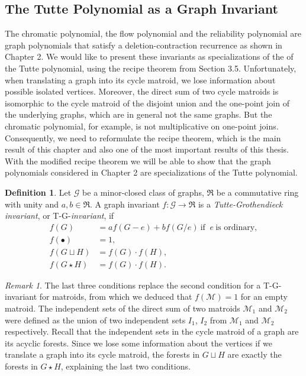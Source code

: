 \documentclass[12pt,a4paper, twoside, autooneside=false]{scrartcl}
\theoremstyle{definition}
\newtheorem{definition}[theorem]{Definition}
\theoremstyle{remark}
\newtheorem{remark}[theorem]{Remark}
\numberwithin{equation}{section}
\newcommand{\M}{\mathcal{M}} %
\begin{document}
\subsection{The Tutte Polynomial as a Graph Invariant}
The chromatic polynomial, the flow polynomial and the reliability polynomial are graph polynomials that satisfy a deletion-contraction recurrence as shown in Chapter 2. We would like to present these invariants as specializations of the of the Tutte polynomial, using the recipe theorem from Section 3.5. Unfortunately, when translating a graph into its cycle matroid, we lose information about possible isolated vertices. Moreover, the direct sum of two cycle matroids is isomorphic to the cycle matroid of the disjoint union and the one-point join of the underlying graphs, which are in general not the same graphs. But the chromatic polynomial, for example, is not multiplicative on one-point joins. Consequently, we need to reformulate the recipe theorem, which is the main result of this chapter and also one of the most important results of this thesis. With the modified recipe theorem we will be able to show that the graph polynomials considered in Chapter 2 are specializations of the Tutte polynomial. 
\begin{definition}
Let $\mathcal{G}$ be a minor-closed class of graphs, $\mathfrak{R}$ be a commutative ring with unity and $a,b \in \mathfrak{R}$. A graph invariant $f : \mathcal{G} \to \mathfrak{R}$ is a \textit{Tutte-Grothendieck invariant}, or T-G-\textit{invariant}, if 
\begin{align*}
f(G) &= a f(G - e) + b f(G / e) \ \text{if } \ e \ \text{is ordinary}, \\ 
f(\bullet) &= 1, \\
f(G \sqcup H) &= f(G) \cdot f(H), \\
f(G \star H) &= f(G) \cdot f(H).
\end{align*}
\end{definition}
\begin{remark}
The last three conditions replace the second condition for a T-G-invariant for matroids, from which we deduced that $f(\M) = 1$ for an empty matroid. The independent sets of the direct sum of two matroids $\M_1$ and $\M_2$ were defined as the union of two independent sets $I_1$, $I_2$ from $\M_1$ and $\M_2$ respectively. Recall that the independent sets in the cycle matroid of a graph are its acyclic forests. Since we lose some information about the vertices if we translate a graph into its cycle matroid, the forests in $G \sqcup H$ are exactly the forests in $G \star H$, explaining the last two conditions.
\end{remark}
\end{document}
